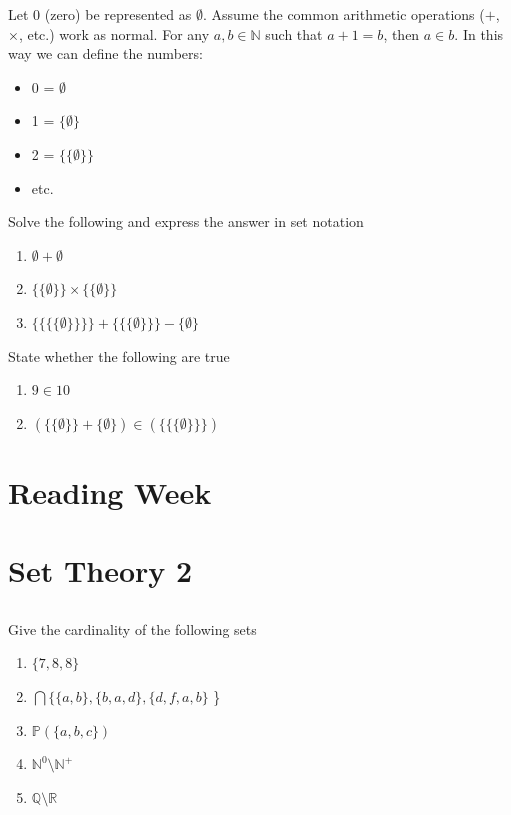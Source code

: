 \documentclass[twocolumn]{article}
\begin{document}
Let 0 (zero) be represented as $\emptyset$. Assume the common arithmetic operations ($+$, $\times$, etc.) work as normal. For any $a, b \in \mathbb{N}$ such that $a + 1 = b$, then $a \in b $. In this way we can define the numbers:

    \begin{itemize}
        \item 0 = $ \emptyset $
        \item 1 = $ \{ \emptyset \} $
        \item 2 = $ \{ \{ \emptyset \} \} $
        \item etc.
    \end{itemize}

     Solve the following and express the answer in set notation
    
    \begin{enumerate}
        \item $ \emptyset + \emptyset $
        \item $ \{ \{ \emptyset \} \} \times \{ \{ \emptyset \} \} $
        \item $\{ \{ \{ \{ \emptyset \} \} \} \} + \{ \{ \{ \emptyset \} \} \} - \{ \emptyset \} $
    \end{enumerate}
    
    State whether the following are true

    \begin{enumerate}
        \item $ 9 \in 10 $
        \item $ (\{ \{ \emptyset \} \} + \{ \emptyset \} ) \in ( \{ \{ \{ \emptyset \} \} \} )$
    \end{enumerate}

\clearpage
\section{Reading Week}
    

\clearpage
\section{Set Theory 2}

\subsection{}

    Give the cardinality of the following sets

    \begin{enumerate}
        \item $\{ 7, 8, 8\}$
        \item $\bigcap \{ \{ a, b \}, \{ b, a, d\}, \{d, f, a, b \}$ \}
        \item $\mathbb{P}(\{ a, b, c\})$
        \item $\mathbb{N}^0 \setminus \mathbb{N}^+$
        \item $\mathbb{Q} \setminus \mathbb{R}$
    \end{enumerate}
\end{document}
